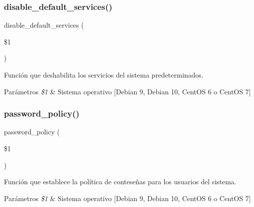 \subsubsection{\texorpdfstring{disable\+\_\+default\+\_\+services()}{disable\_default\_services()}}
{\footnotesize\ttfamily disable\+\_\+default\+\_\+services (\begin{DoxyParamCaption}\item[{}]{\$1 }\end{DoxyParamCaption})}



Función que deshabilita los servicios del sistema predeterminados. 


\begin{DoxyParams}{Parámetros}
{\em \$1} & Sistema operativo \mbox{[}\textquotesingle{}Debian 9\textquotesingle{}, \textquotesingle{}Debian 10\textquotesingle{}, \textquotesingle{}Cent\+OS 6\textquotesingle{} o \textquotesingle{}Cent\+OS 7\textquotesingle{}\mbox{]} \\
\hline
\end{DoxyParams}
\mbox{\label{Configuraciones__Generales_8sh_ac4fb2a5b8684da33e70460b3b419f32d}} 
\subsubsection{\texorpdfstring{password\+\_\+policy()}{password\_policy()}}
{\footnotesize\ttfamily password\+\_\+policy (\begin{DoxyParamCaption}\item[{}]{\$1 }\end{DoxyParamCaption})}



Función que establece la política de conteseñas para los usuarios del sistema. 


\begin{DoxyParams}{Parámetros}
{\em \$1} & Sistema operativo \mbox{[}\textquotesingle{}Debian 9\textquotesingle{}, \textquotesingle{}Debian 10\textquotesingle{}, \textquotesingle{}Cent\+OS 6\textquotesingle{} o \textquotesingle{}Cent\+OS 7\textquotesingle{}\mbox{]} \\
\hline
\end{DoxyParams}
\mbox{\label{Configuraciones__Generales_8sh_a2d14b76d44400f8580c56fd4d74022ae}} 
